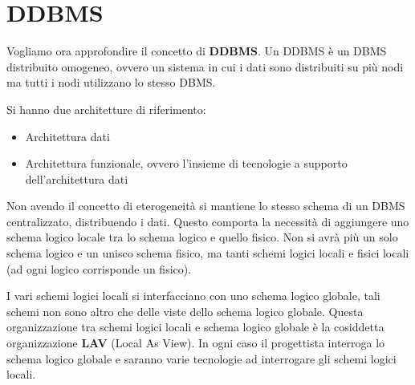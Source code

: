 \section{DDBMS}
Vogliamo ora approfondire il concetto di \textbf{DDBMS}. Un DDBMS è un DBMS
distribuito omogeneo, ovvero un sistema in cui i dati sono distribuiti su più
nodi ma tutti i nodi utilizzano lo stesso DBMS.

Si hanno due architetture di riferimento:
\begin{itemize}
      \item Architettura dati
      \item Architettura funzionale, ovvero l'insieme di tecnologie a supporto
            dell'architettura dati
\end{itemize}

Non avendo il concetto di eterogeneità si mantiene lo stesso schema di un DBMS
centralizzato, distribuendo i dati. Questo comporta la necessità di aggiungere
uno schema logico locale tra lo schema logico e quello fisico. Non si avrà più
un solo schema logico e un unisco schema fisico, ma tanti schemi logici locali e
fisici locali (ad ogni logico corrisponde un fisico).

I vari schemi logici locali si interfacciano con uno schema logico globale,
tali schemi non sono altro che delle viste dello schema logico globale. Questa
organizzazione tra schemi logici locali e schema logico globale è la cosiddetta
organizzazione \textbf{LAV} (Local As View). In ogni caso il progettista interroga
lo schema logico globale e saranno varie tecnologie ad interrogare gli schemi
logici locali.

